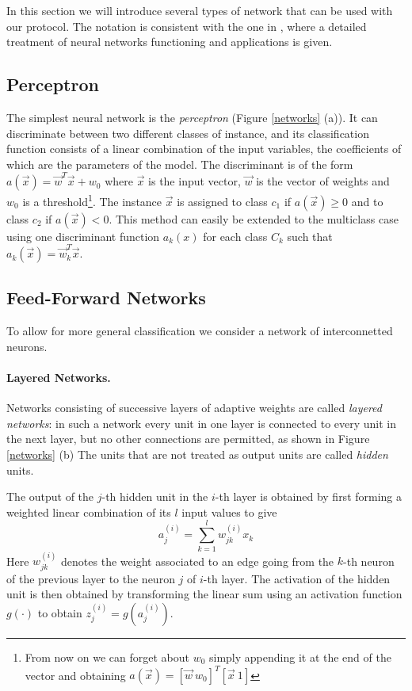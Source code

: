 \documentclass[11pt,oribibl,runningheads]{llncs}
\begin{document}
In this section we will introduce several types of network that
can be used with our protocol. The notation is consistent with the
one in \cite{bishop1995nnp}, where a detailed treatment of neural
networks functioning and applications is given.

\subsection{Perceptron}
The simplest neural network is the {\em perceptron} (Figure
\ref{networks} (a)). It can discriminate between two different
classes of instance, and its classification function consists of a
linear combination of the input variables, the coefficients of which
are the parameters of the model. The discriminant is of the form $ a(\vec{x})=\vec{w}^T\vec{x} + w_0 $
where $\vec{x}$ is the input vector, $\vec{w}$ is the vector of
weights and $w_0$ is a threshold\footnote{From now on we can forget about $w_0$ simply appending it at the end of the vector and obtaining $a(\vec{x})=[\vec{w} \ w_0]^T[\vec{x} \ 1]$}. The instance $\vec{x}$ is assigned
to class $c_1$ if $a(\vec{x}) \geq 0$ and to class $c_2$ if
$a(\vec{x})<0$.  This method can easily be extended to the multiclass case using
one discriminant function $a_k(x)$ for each class $C_k$ such that
$a_k(\vec{x})=\vec{w}^T_k\vec{x}$.

\subsection{Feed-Forward Networks}
To allow for more general classification we consider a network of interconnetted neurons.

\paragraph{Layered Networks.}
Networks consisting of successive layers of adaptive weights are
called {\em layered networks}: in such a network every unit in one
layer is connected to every unit in the next layer, but no other
connections are permitted, as shown in Figure \ref{networks} (b)
The units that are not treated as output units are called {\em
hidden} units.

The output of the $j$-th hidden unit in the $i$-th layer is
obtained by first forming a weighted linear combination of its $l$
input values to give
$$
a^{(i)}_j = \sum_{k=1}^l w^{(i)}_{jk}x_k
$$
Here $w_{jk}^{(i)}$ denotes the weight associated to an edge going
from the $k$-th neuron of the previous layer to the neuron $j$ of
$i$-th layer. The activation of the hidden unit is then obtained
by transforming the linear sum using an activation function
$g(\cdot)$ to obtain $z^{(i)}_j=g\left(a^{(i)}_j\right)$.
\end{document}
